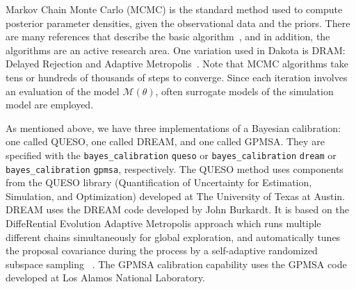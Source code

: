 Markov Chain Monte Carlo (MCMC) is the standard method used to compute 
posterior parameter densities, given the observational data 
and the priors. There are many references that 
describe the basic algorithm~\cite{Gilks}, and in addition, the algorithms 
are an active research area.  One variation used in Dakota is DRAM: 
Delayed Rejection and Adaptive Metropolis~\cite{Haario}. Note that 
MCMC algorithms take tens or hundreds of thousands of steps to converge. 
Since each iteration involves an evaluation of the model 
$\mathcal{M}(\theta)$, often surrogate models of the simulation 
model are employed.
 
As mentioned above, we have three implementations of a Bayesian 
calibration:  one called QUESO, one called DREAM, and one called GPMSA. 
They are specified with the \texttt{bayes\_calibration} \texttt{queso}
or \texttt{bayes\_calibration} \texttt{dream} or 
\texttt{bayes\_calibration} \texttt{gpmsa}, respectively.
The QUESO method uses components from the QUESO library
(Quantification of Uncertainty for Estimation, Simulation, and
Optimization) developed at The University of Texas at Austin.
DREAM uses the DREAM code developed by John Burkardt. 
It is based on the DiffeRential Evolution Adaptive
Metropolis approach which runs multiple different chains simultaneously
for global exploration, and automatically tunes the proposal covariance
during the process by a self-adaptive randomized subspace sampling
~\cite{Vrugt}.
The GPMSA calibration capability uses the GPMSA code developed at 
Los Alamos National Laboratory.

